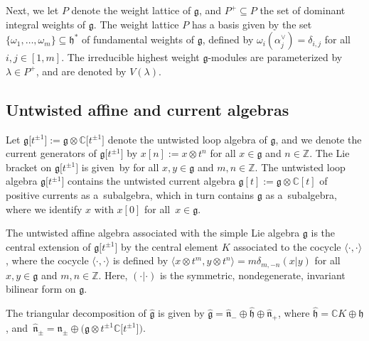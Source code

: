 \documentclass[10pt,a4paper]{amsart}
\numberwithin{equation}{section}
\begin{document}
Next, we let $P$ denote the weight lattice of $\mathfrak{g}$, and $P^+\subseteq P$ the set of dominant integral weights of $\mathfrak{g}$. The weight lattice $P$ has a basis given by the set $\{\omega_1,\dots,\omega_m\}\subseteq\mathfrak{h}^*$ of fundamental weights of $\mathfrak{g}$, defined by $\omega_i(\alpha_j^{\vee})=\delta_{i,j}$ for all $i,j\in[1,m]$. The irreducible highest weight $\mathfrak{g}$-modules are parameterized by $\lambda\in P^+$, and are denoted by $V({\lambda})$.

\subsection{Untwisted affine and current algebras}\label{Section 2.1}

Let $\mathfrak{g}\bigl[t^{\pm1}\bigr]:=\mathfrak{g}\otimes\mathbb{C}\bigl[t^{\pm1}\bigr]$ denote the untwisted loop algebra of $\mathfrak{g}$, and we denote the current generators of $\mathfrak{g}\bigl[t^{\pm1}\bigr]$ by $x[n]:=x\otimes t^n$ for all $x\in\mathfrak{g}$ and $n\in\mathbb{Z}$. The Lie bracket on $\mathfrak{g}\bigl[t^{\pm1}\bigr]$ is given~by
for all $x,y\in\mathfrak{g}$ and $m,n\in\mathbb{Z}$. The untwisted loop algebra $\mathfrak{g}\bigl[t^{\pm1}\bigr]$ contains the untwisted current algebra $\mathfrak{g}[t]:=\mathfrak{g}\otimes\mathbb{C}[t]$ of positive currents as a~subalgebra, which in turn contains $\mathfrak{g}$ as a~subalgebra, where we identify $x$ with $x[0]$ for all~${x\in\mathfrak{g}}$.

The untwisted affine algebra  associated with the simple Lie algebra $\mathfrak{g}$ is the central extension of $\mathfrak{g}\bigl[t^{\pm1}\bigr]$ by the central element $K$ associated to the cocycle $\langle\cdot,\cdot\rangle$, where the cocycle $\langle\cdot,\cdot\rangle$ is defined by
$
\big\langle x\otimes t^m,y\otimes t^n\big\rangle = m\delta_{m,-n}(x|y)$
for all $x,y\in\mathfrak{g}$ and $m,n\in\mathbb{Z}$. Here, $(\cdot|\cdot)$ is the symmetric, nondegenerate, invariant bilinear form on $\mathfrak{g}$.

The triangular decomposition of $\widehat{\mathfrak{g}}$ is given by $\widehat{\mathfrak{g}}=\widehat{\mathfrak{n}}_-\oplus\widehat{\mathfrak{h}}\oplus\widehat{\mathfrak{n}}_+$, where $\widehat{\mathfrak{h}}=\mathbb{C}K\oplus\mathfrak{h}$, and~${\widehat{\mathfrak{n}}_{\pm}=\mathfrak{n}_{\pm}\oplus \bigl(\mathfrak{g}\otimes t^{\pm1}\mathbb{C}\bigl[t^{\pm1}\bigr]\bigr)}$.
\end{document}
